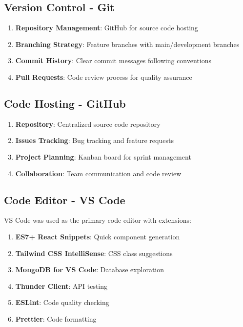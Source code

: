 \documentclass[12pt,a4paper]{report}
\begin{document}
\subsection{Version Control - Git}

\begin{enumerate}[label=\roman*)]
    \item \textbf{Repository Management}: GitHub for source code hosting
    \item \textbf{Branching Strategy}: Feature branches with main/development branches
    \item \textbf{Commit History}: Clear commit messages following conventions
    \item \textbf{Pull Requests}: Code review process for quality assurance
\end{enumerate}

\subsection{Code Hosting - GitHub}

\begin{enumerate}[label=\roman*)]
    \item \textbf{Repository}: Centralized source code repository
    \item \textbf{Issues Tracking}: Bug tracking and feature requests
    \item \textbf{Project Planning}: Kanban board for sprint management
    \item \textbf{Collaboration}: Team communication and code review
\end{enumerate}

\subsection{Code Editor - VS Code}

VS Code was used as the primary code editor with extensions:

\begin{enumerate}[label=\roman*)]
    \item \textbf{ES7+ React Snippets}: Quick component generation
    \item \textbf{Tailwind CSS IntelliSense}: CSS class suggestions
    \item \textbf{MongoDB for VS Code}: Database exploration
    \item \textbf{Thunder Client}: API testing
    \item \textbf{ESLint}: Code quality checking
    \item \textbf{Prettier}: Code formatting
\end{enumerate}
\end{document}
